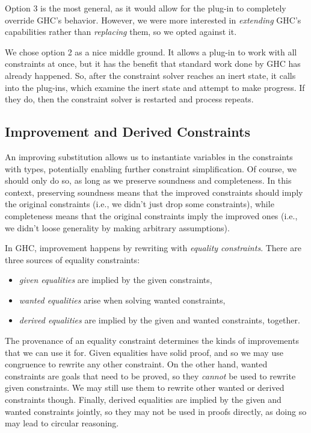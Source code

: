 \documentclass{sigplanconf}
\begin{document}
Option 3 is the most general, as it
would allow for the plug-in to completely override GHC's behavior.  However,
we were more interested in {\em extending} GHC's capabilities rather than
{\em replacing} them, so we opted against it.

We chose option 2 as a nice middle ground. It allows a plug-in to
work with all constraints at once, but it has the benefit that standard work
done by GHC has already happened. So, after the constraint
solver reaches an inert state, it calls into the plug-ins, which examine
the inert state and attempt to make progress.  If they do, then the
constraint solver is restarted and process repeats.

\subsection{Improvement and Derived Constraints}
An improving substitution \cite{improvement} allows us to instantiate variables
in the constraints with types, potentially enabling further constraint
simplification.  Of course, we should only do so, as long
as we preserve soundness and completeness.  In this context, preserving
soundness means that the improved constraints should imply the original
constraints (i.e., we didn't just drop some constraints),
while completeness means that the original constraints imply the improved ones
(i.e., we didn't loose generality by making arbitrary assumptions).

In GHC, improvement happens by rewriting with {\em equality constraints}.
There are three sources of equality constraints:
\begin{itemize}
\item {\em given equalities} are implied by the given constraints,
\item {\em wanted equalities} arise when solving wanted constraints,
\item {\em derived equalities} are implied by the given and wanted constraints,
together.
\end{itemize}

The provenance of an equality constraint determines the kinds of
improvements that we can use it for.  Given equalities have solid proof,
and so we may use congruence to rewrite any other constraint.
On the other hand, wanted constraints are goals that need to be proved,
so they {\em cannot} be used to rewrite given constraints.  We may still
use them to rewrite other wanted or derived constraints though.
Finally, derived equalities are implied by the given and wanted constraints
jointly, so they may not be used in proofs directly,
as doing so may lead to circular reasoning.
\end{document}
